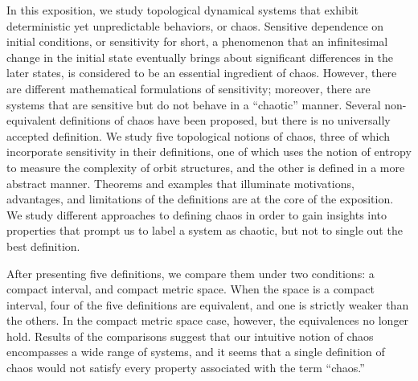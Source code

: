 \documentclass[10pt,twoside,draft]{book}
\begin{document}
In this exposition, we study topological dynamical systems that exhibit deterministic yet unpredictable behaviors, or chaos.
Sensitive dependence on initial conditions, or sensitivity for short, a phenomenon that an infinitesimal change in the initial state eventually brings about significant differences in the later states, is considered to be an essential ingredient of chaos. 
However, there are different mathematical formulations of sensitivity; moreover, there are systems that are sensitive but do not behave in a ``chaotic'' manner.
Several non-equivalent definitions of chaos have been proposed, but there is no universally accepted definition.
We study five topological notions of chaos, three of which incorporate sensitivity in their definitions, one of which uses the notion of entropy to measure the complexity of orbit structures, and the other is defined in a more abstract manner.
Theorems and examples that illuminate motivations, advantages, and limitations of the definitions are at the core of the exposition.
We study different approaches to defining chaos in order to gain insights into properties that prompt us to label a system as chaotic, but not to single out the best definition.

After presenting five definitions, we compare them under two conditions: a compact interval, and compact metric space.
When the space is a compact interval, four of the five definitions are equivalent, and one is strictly weaker than the others.
In the compact metric space case, however, the equivalences no longer hold.
Results of the comparisons suggest that our intuitive notion of chaos encompasses a wide range of systems, and it seems that a single definition of chaos would not satisfy every property associated with the term ``chaos.''



\end{document}
